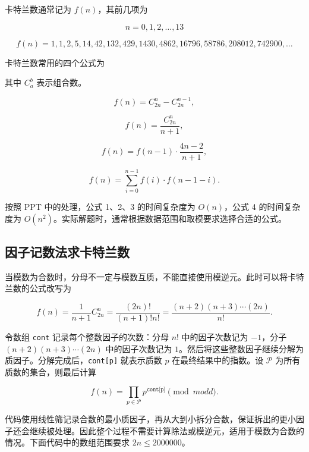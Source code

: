 \documentclass[UTF8,a4paper,11pt]{ctexart}
\begin{document}
卡特兰数通常记为 $f(n)$，其前几项为

\[
n=0,1,2,\ldots,13
\]

\[
f(n)=1,1,2,5,14,42,132,429,1430,4862,16796,58786,208012,742900,\ldots
\]

卡特兰数常用的四个公式为

其中 $C_a^b$ 表示组合数。

\[
f(n)=C_{2n}^{n}-C_{2n}^{n-1},
\]

\[
f(n)=\frac{C_{2n}^{n}}{n+1},
\]

\[
f(n)=f(n-1)\cdot\frac{4n-2}{n+1},
\]

\[
f(n)=\sum_{i=0}^{n-1}f(i)\cdot f(n-1-i).
\]

按照 PPT 中的处理，公式 1、2、3 的时间复杂度为 $O(n)$，公式 4 的时间复杂度为 $O(n^2)$。实际解题时，通常根据数据范围和取模要求选择合适的公式。

\subsection{因子记数法求卡特兰数}

当模数为合数时，分母不一定与模数互质，不能直接使用模逆元。此时可以将卡特兰数的公式改写为

\[
f(n)=\frac{1}{n+1}C_{2n}^{n}
    =\frac{(2n)!}{(n+1)!n!}
    =\frac{(n+2)(n+3)\cdots(2n)}{n!}.
\]

令数组 \texttt{cont} 记录每个整数因子的次数：分母 $n!$ 中的因子次数记为 $-1$，分子 $(n+2)(n+3)\cdots(2n)$ 中的因子次数记为 $1$。然后将这些整数因子继续分解为质因子。分解完成后，\texttt{cont[p]} 就表示质数 $p$ 在最终结果中的指数。设 $\mathcal{P}$ 为所有质数的集合，则最后计算

\[
f(n)=\prod_{p\in\mathcal{P}}p^{\texttt{cont[p]}}\pmod{modd}.
\]

代码使用线性筛记录合数的最小质因子，再从大到小拆分合数，保证拆出的更小因子还会继续被处理。因此整个过程不需要计算除法或模逆元，适用于模数为合数的情况。下面代码中的数组范围要求 $2n\le 2000000$。
\end{document}
